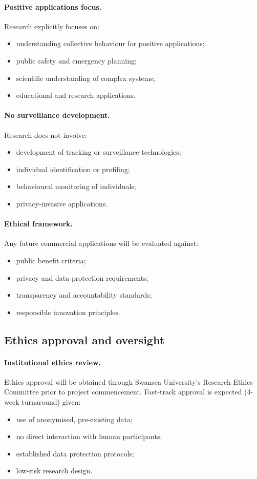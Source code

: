 \paragraph{Positive applications focus.}
Research explicitly focuses on:
\begin{itemize}
  \item understanding collective behaviour for positive applications;
  \item public safety and emergency planning;
  \item scientific understanding of complex systems;
  \item educational and research applications.
\end{itemize}

\paragraph{No surveillance development.}
Research does not involve:
\begin{itemize}
  \item development of tracking or surveillance technologies;
  \item individual identification or profiling;
  \item behavioural monitoring of individuals;
  \item privacy-invasive applications.
\end{itemize}

\paragraph{Ethical framework.}
Any future commercial applications will be evaluated against:
\begin{itemize}
  \item public benefit criteria;
  \item privacy and data protection requirements;
  \item transparency and accountability standards;
  \item responsible innovation principles.
\end{itemize}

\subsection{Ethics approval and oversight}

\paragraph{Institutional ethics review.}
Ethics approval will be obtained through Swansea University's Research Ethics Committee prior to project commencement. Fast-track approval is expected (4-week turnaround) given:
\begin{itemize}
  \item use of anonymised, pre-existing data;
  \item no direct interaction with human participants;
  \item established data protection protocols;
  \item low-risk research design.
\end{itemize}

